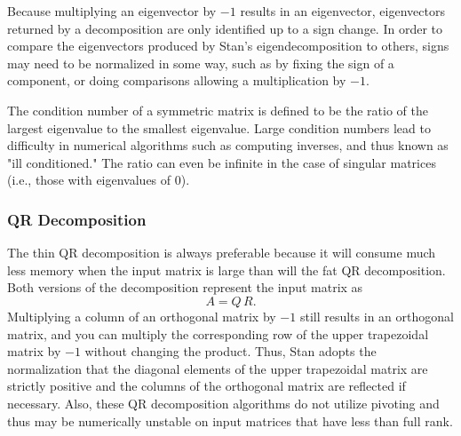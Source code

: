\begin{description}
{\begin{description}
Because multiplying an eigenvector by $-1$ results in an eigenvector, eigenvectors returned by a decomposition are only identified up to a sign change.  In order to compare the eigenvectors produced by Stan's eigendecomposition to others, signs may need to be normalized in some way, such as by fixing the sign of a component, or doing comparisons allowing a multiplication by $-1$.


The condition number of a symmetric matrix is defined to be the ratio of the largest eigenvalue to the smallest eigenvalue.  Large condition numbers lead to difficulty in numerical algorithms such as computing inverses, and thus known as "ill conditioned."  The ratio can even be infinite in the case of singular matrices (i.e., those with eigenvalues of 0).


\subsubsection{QR Decomposition}\label{QR-decomposition}


\begin{description}     \end{description}


The thin QR decomposition is always preferable because it will consume much less memory when the input matrix is large than will the fat QR  decomposition. Both versions of the decomposition represent the input matrix as \[ A = Q \, R. \] Multiplying a column of an orthogonal matrix by $-1$ still results in an orthogonal matrix, and you can multiply the corresponding row of the upper trapezoidal matrix by $-1$ without changing the product. Thus, Stan adopts the normalization that the diagonal elements of the upper trapezoidal matrix are strictly positive and the columns of the orthogonal matrix are reflected if necessary. Also, these QR  decomposition algorithms do not utilize pivoting and thus may be  numerically unstable on input matrices that have less than full rank.



\end{description}}
\end{description}
